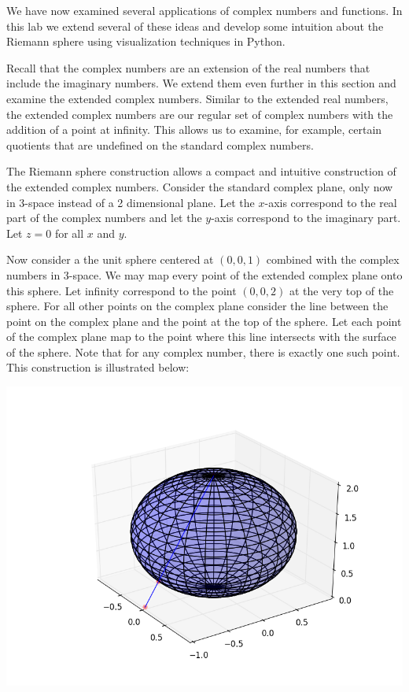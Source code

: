 

We have now examined several applications of complex numbers and functions.  In this lab we extend several of these ideas and develop some intuition about the Riemann sphere using visualization techniques in Python.

Recall that the complex numbers are an extension of the real numbers that include the imaginary numbers.  We extend them even further in this section and examine the extended complex numbers.  Similar to the extended real numbers, the extended complex numbers are our regular set of complex numbers with the addition of a point at infinity.  This allows us to examine, for example, certain quotients that are undefined on the standard complex numbers.

The Riemann sphere construction allows a compact and intuitive construction of the extended complex numbers.  Consider the standard complex plane, only now in 3-space instead of a 2 dimensional plane. Let the $x$-axis correspond to the real part of the complex numbers and let the $y$-axis correspond to the imaginary part.  Let $z=0$ for all $x$ and $y$. 

Now consider a the unit sphere centered at $(0,0,1)$ combined with the complex numbers in 3-space. We may map every point of the extended complex plane onto this sphere. Let infinity correspond to the point $(0,0,2)$ at the very top of the sphere. For all other points on the complex plane consider the line between the point on the complex plane and the point at the top of the sphere. Let each point of the complex plane map to the point where this line intersects with the surface of the sphere. Note that for any complex number, there is exactly one such point. This construction is illustrated below:

\includegraphics[width=\textwidth]{StereographicIllustration.png}

